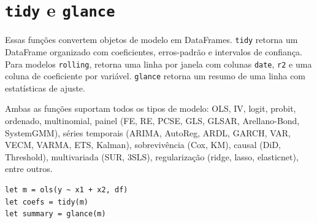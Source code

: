 \section{\texttt{tidy} e \texttt{glance}}

Essas funções convertem objetos de modelo em DataFrames. \texttt{tidy}
retorna um DataFrame organizado com coeficientes, erros-padrão e
intervalos de confiança. Para modelos \texttt{rolling}, retorna uma
linha por janela com colunas \texttt{date}, \texttt{r2} e uma coluna de
coeficiente por variável. \texttt{glance} retorna um resumo de uma
linha com estatísticas de ajuste.

Ambas as funções suportam todos os tipos de modelo: OLS, IV, logit,
probit, ordenado, multinomial, painel (FE, RE, PCSE, GLS, GLSAR,
Arellano-Bond, SystemGMM), séries temporais (ARIMA, AutoReg, ARDL,
GARCH, VAR, VECM, VARMA, ETS, Kalman), sobrevivência (Cox, KM), causal
(DiD, Threshold), multivariada (SUR, 3SLS), regularização (ridge, lasso,
elasticnet), entre outros.

\begin{lstlisting}[caption={Tidy e glance}]
let m = ols(y ~ x1 + x2, df)
let coefs = tidy(m)
let summary = glance(m)
\end{lstlisting}
